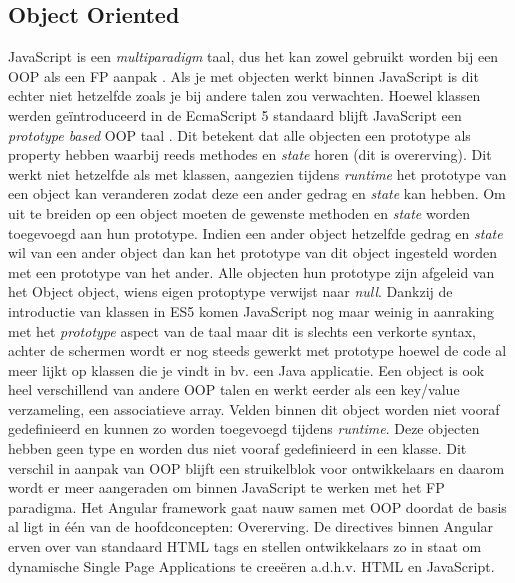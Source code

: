 \subsection{Object Oriented}
JavaScript is een \textit{multiparadigm} taal, dus het kan zowel gebruikt worden bij een OOP als een FP aanpak \autocite{Atencio2016}. Als je met objecten werkt binnen JavaScript is dit echter niet hetzelfde zoals je bij andere talen zou verwachten. Hoewel klassen werden geïntroduceerd in de EcmaScript 5 standaard blijft JavaScript een \textit{prototype based} OOP taal \autocite{Blaschek1994}. Dit betekent dat alle objecten een prototype als property hebben waarbij reeds methodes en \textit{state} horen (dit is overerving). Dit werkt niet hetzelfde als met klassen, aangezien tijdens \textit{runtime} het prototype van een object kan veranderen zodat deze een ander gedrag en \textit{state} kan hebben. Om uit te breiden op een object moeten de gewenste methoden en \textit{state} worden toegevoegd aan hun prototype. Indien een ander object hetzelfde gedrag en \textit{state} wil van een ander object dan kan het prototype van dit object ingesteld worden met een prototype van het ander. Alle objecten hun prototype zijn afgeleid van het Object object, wiens eigen protoptype verwijst naar \textit{null}. Dankzij de introductie van klassen in ES5 komen JavaScript nog maar weinig in aanraking met het \textit{prototype} aspect van de taal maar dit is slechts een verkorte syntax, achter de schermen wordt er nog steeds gewerkt met prototype hoewel de code al meer lijkt op klassen die je vindt in bv. een Java applicatie. Een object is ook heel verschillend van andere OOP talen en werkt eerder als een key/value verzameling, een associatieve array. Velden binnen dit object worden niet vooraf gedefinieerd en kunnen zo worden toegevoegd tijdens \textit{runtime}. Deze objecten hebben geen type en worden dus niet vooraf gedefinieerd in een klasse. Dit verschil in aanpak van OOP blijft een struikelblok voor ontwikkelaars en daarom wordt er meer aangeraden om binnen JavaScript te werken met het FP paradigma. Het Angular framework gaat nauw samen met OOP doordat de basis al ligt in één van de hoofdconcepten: Overerving. De directives binnen Angular erven over van standaard HTML tags en stellen ontwikkelaars zo in staat om dynamische Single Page Applications te creeëren a.d.h.v. HTML en JavaScript.

